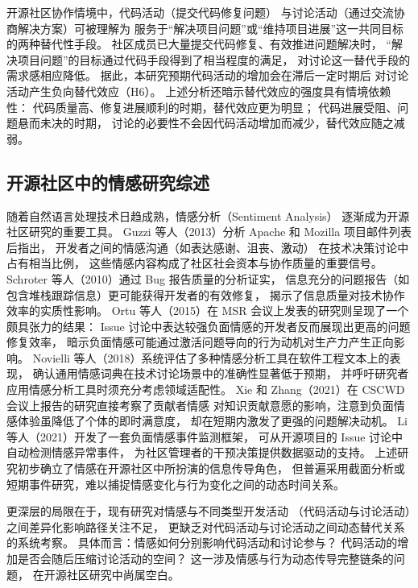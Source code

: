 开源社区协作情境中，代码活动（提交代码修复问题）
与讨论活动（通过交流协商解决方案）可被理解为
服务于“解决项目问题”或“维持项目进展”这一共同目标的两种替代性手段。
社区成员已大量提交代码修复、有效推进问题解决时，
“解决项目问题”的目标通过代码手段得到了相当程度的满足，
对讨论这一替代手段的需求感相应降低。
据此，本研究预期代码活动的增加会在滞后一定时期后
对讨论活动产生负向替代效应（H6）。
上述分析还暗示替代效应的强度具有情境依赖性：
代码质量高、修复进展顺利的时期，替代效应更为明显；
代码进展受阻、问题悬而未决的时期，
讨论的必要性不会因代码活动增加而减少，替代效应随之减弱。

\subsection{开源社区中的情感研究综述}

随着自然语言处理技术日趋成熟，情感分析（Sentiment Analysis）
逐渐成为开源社区研究的重要工具。
Guzzi 等人（2013）分析 Apache 和 Mozilla 项目邮件列表后指出，
开发者之间的情感沟通（如表达感谢、沮丧、激动）
在技术决策讨论中占有相当比例，
这些情感内容构成了社区社会资本与协作质量的重要信号\cite{guzzi2013}。
Schroter 等人（2010）通过 Bug 报告质量的分析证实，
信息充分的问题报告（如包含堆栈跟踪信息）更可能获得开发者的有效修复，
揭示了信息质量对技术协作效率的实质性影响\cite{schroter2010}。
Ortu 等人（2015）在 MSR 会议上发表的研究则呈现了一个颇具张力的结果：
Issue 讨论中表达较强负面情感的开发者反而展现出更高的问题修复效率，
暗示负面情感可能通过激活问题导向的行为动机对生产力产生正向影响\cite{ortu2015bullies}。
Novielli 等人（2018）系统评估了多种情感分析工具在软件工程文本上的表现，
确认通用情感词典在技术讨论场景中的准确性显著低于预期，
并呼吁研究者应用情感分析工具时须充分考虑领域适配性\cite{novielli2018sentiment}。
Xie 和 Zhang（2021）在 CSCWD 会议上报告的研究直接考察了贡献者情感
对知识贡献意愿的影响，注意到负面情感体验虽降低了个体的即时满意度，
却在短期内激发了更强的问题解决动机\cite{xie2021influence}。
Li 等人（2021）开发了一套负面情感事件监测框架，
可从开源项目的 Issue 讨论中自动检测情感异常事件，
为社区管理者的干预决策提供数据驱动的支持\cite{li2021monitoring}。
上述研究初步确立了情感在开源社区中所扮演的信息传导角色，
但普遍采用截面分析或短期事件研究，难以捕捉情感变化与行为变化之间的动态时间关系。

更深层的局限在于，现有研究对情感与不同类型开发活动
（代码活动与讨论活动）之间差异化影响路径关注不足，
更缺乏对代码活动与讨论活动之间动态替代关系的系统考察。
具体而言：情感如何分别影响代码活动和讨论参与？
代码活动的增加是否会随后压缩讨论活动的空间？
这一涉及情感与行为动态传导完整链条的问题，
在开源社区研究中尚属空白。

